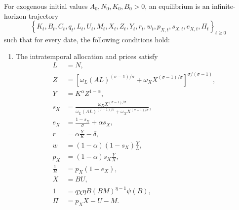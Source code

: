 \begin{definition}[Equilibrium]
\label{def:rewrite-equilibrium}
For exogenous initial values $A_0,N_0,K_0,B_0>0$, an equilibrium is an
infinite-horizon trajectory
\begin{equation}
 \left\{K_t,B_t,C_t,q_t,L_t,U_t,M_t,X_t,Z_t,Y_t,r_t,w_t,p_{X,t},
 s_{X,t},e_{X,t},\Pi_t\right\}_{t\geq0}
 \label{eq:rewrite-equilibrium-trajectory}
\end{equation} such that for every date, the
following conditions hold:

\begin{enumerate}
\item The intratemporal allocation and prices satisfy
\begin{subequations}
\label{eq:rewrite-equilibrium-static}
\begin{align}
 L&=N,
 \label{eq:rewrite-eq-labor}\\
 Z&=\left[\omega_L(AL)^{(\sigma-1)/\sigma}
 +\omega_XX^{(\sigma-1)/\sigma}\right]^{
 \sigma/(\sigma-1)},
 \label{eq:rewrite-eq-z}\\
 Y&=K^\alpha Z^{1-\alpha},
 \label{eq:rewrite-eq-y}\\
 s_X&=\frac{\omega_XX^{(\sigma-1)/\sigma}}
 {\omega_L(AL)^{(\sigma-1)/\sigma}
 +\omega_XX^{(\sigma-1)/\sigma}},
 \label{eq:rewrite-eq-sx}\\
 e_X&=\frac{1-s_X}{\sigma}+\alpha s_X,
 \label{eq:rewrite-eq-ex}\\
 r&=\alpha\frac{Y}{K}-\delta,
 \label{eq:rewrite-eq-r}\\
 w&=(1-\alpha)(1-s_X)\frac{Y}{L},
 \label{eq:rewrite-eq-w}\\
 p_X&=(1-\alpha)s_X\frac{Y}{X},
 \label{eq:rewrite-eq-px}\\
 \frac{1}{B}&=p_X(1-e_X),
 \label{eq:rewrite-eq-monopoly}\\
 X&=BU,
 \label{eq:rewrite-eq-service}\\
 1&=q\chi\eta B(BM)^{\eta-1}\psi(B),
 \label{eq:rewrite-eq-research}\\
 \Pi&=p_XX-U-M.
 \label{eq:rewrite-eq-profit}

\end{align}
\end{subequations}
\end{enumerate}
\end{definition}
